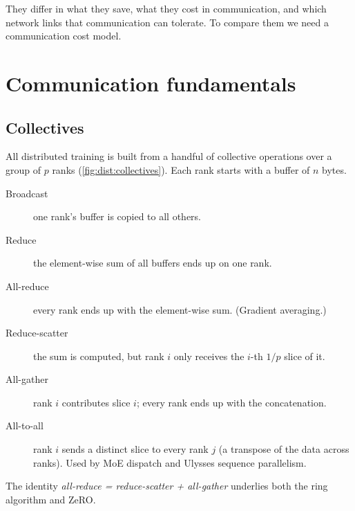 They differ in what they save, what they cost in communication, and which network links that
communication can tolerate. To compare them we need a communication cost model.

\section{Communication fundamentals}\label{sec:dist:comm}

\subsection{Collectives}
All distributed training is built from a handful of collective operations over a group of
$p$ ranks (\cref{fig:dist:collectives}). Each rank starts with a buffer of $n$ bytes.

\begin{description}
\item[Broadcast] one rank's buffer is copied to all others.
\item[Reduce] the element-wise sum of all buffers ends up on one rank.
\item[All-reduce] every rank ends up with the element-wise sum. (Gradient averaging.)
\item[Reduce-scatter] the sum is computed, but rank $i$ only receives the $i$-th $1/p$ slice of it.
\item[All-gather] rank $i$ contributes slice $i$; every rank ends up with the concatenation.
\item[All-to-all] rank $i$ sends a distinct slice to every rank $j$ (a transpose of the
  data across ranks). Used by MoE dispatch and Ulysses sequence parallelism.
\end{description}
The identity \emph{all-reduce = reduce-scatter + all-gather} underlies both the ring
algorithm and ZeRO.

